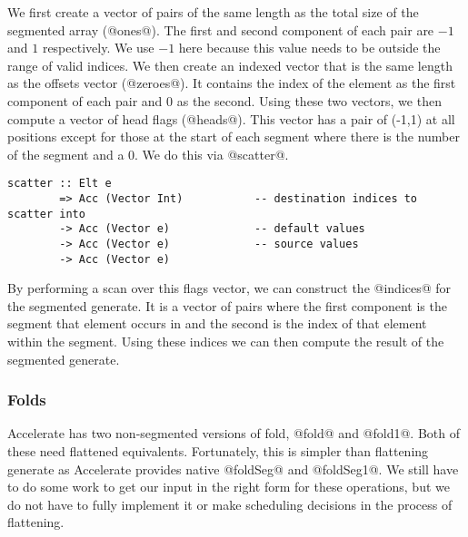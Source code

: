 We first create a vector of pairs of the same length as the total size of the segmented array (@ones@). The first and second component of each pair are $-1$ and $1$ respectively. We use $-1$ here because this value needs to be outside the range of valid indices. We then create an indexed vector that is the same length as the offsets vector (@zeroes@). It contains the index of the element as the first component of each pair and 0 as the second. Using these two vectors, we then compute a vector of head flags (@heads@). This vector has a pair of (-1,1) at all positions except for those at the start of each segment where there is the number of the segment and a 0. We do this via @scatter@.
%
\begin{lstlisting}
scatter :: Elt e
        => Acc (Vector Int)           -- destination indices to scatter into
        -> Acc (Vector e)             -- default values
        -> Acc (Vector e)             -- source values
        -> Acc (Vector e)
\end{lstlisting}
%
By performing a scan over this flags vector, we can construct the @indices@ for the segmented generate. It is a vector of pairs where the first component is the segment that element occurs in and the second is the index of that element within the segment. Using these indices we can then compute the result of the segmented generate.

\subsubsection{Folds}
Accelerate has two non-segmented versions of fold, @fold@ and @fold1@. Both of these need flattened equivalents. Fortunately, this is simpler than flattening generate as Accelerate provides native @foldSeg@ and @foldSeg1@. We still have to do some work to get our input in the right form for these operations, but we do not have to fully implement it or make scheduling decisions in the process of flattening.


